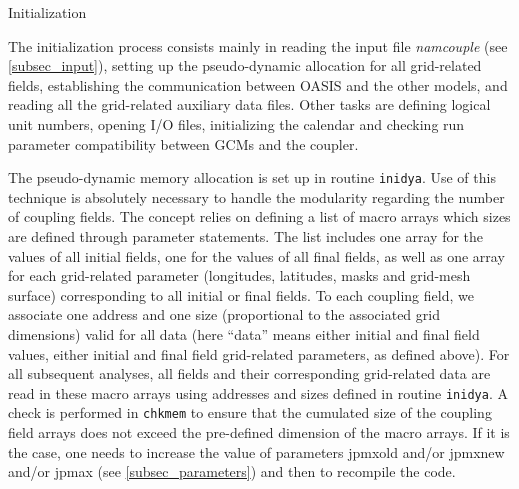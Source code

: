 \begin{subsection}{Initialization}
\label{subsec_initialization}

The initialization process consists mainly in reading the input file
{\em namcouple} (see \ref{subsec_input}), setting up the
pseudo-dynamic allocation for all 
grid-related fields, establishing the communication between OASIS 
and the other models, and reading all the grid-related auxiliary data files. 
Other tasks are defining logical unit numbers, opening I/O files, initializing
the calendar and checking run parameter compatibility between GCMs and the 
coupler.

\vspace{0.4cm}

The pseudo-dynamic memory allocation is set up in routine {\tt inidya}.
Use of this technique is absolutely necessary to handle the modularity
regarding the number of coupling fields. The concept relies on
defining a list of macro arrays which sizes are defined through parameter
statements. The list includes one array for the values of all initial
fields, one for the values of all final fields,
as well as one array for each grid-related parameter (longitudes,
latitudes, masks and grid-mesh surface) corresponding to all initial
or final fields. 
To each coupling field, 
we associate one address and one size (proportional to the associated
grid dimensions) valid for all data (here ``data'' means either
initial and final 
field values, either initial and final field grid-related parameters,
as defined above). For all subsequent analyses, all fields and
their corresponding grid-related data are read in these macro arrays
using addresses and sizes defined in routine {\tt inidya}.
A check is performed in {\tt chkmem} to ensure that the cumulated size 
of the coupling field arrays does not exceed the pre-defined dimension
of the macro arrays. If it is the case,
one needs to increase the value of parameters jpmxold and/or jpmxnew and/or 
jpmax (see \ref{subsec_parameters}) and then to recompile the code.

\vspace{0.4cm}



\end{subsection}
